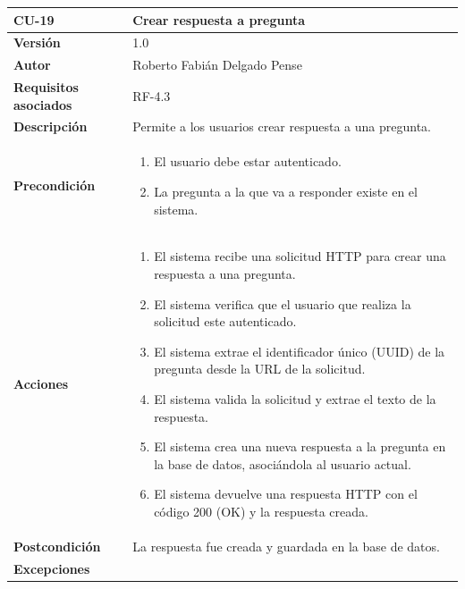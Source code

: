 \begin{table}[p]
	\centering
	\begin{tabularx}{\linewidth}{ p{} p{} }
		\toprule
		\textbf{CU-19}    & \textbf{Crear respuesta a pregunta}\\
		\toprule
		\textbf{Versión}              & 1.0    \\
		\textbf{Autor}                & Roberto Fabián Delgado Pense \\
		\textbf{Requisitos asociados} & RF-4.3 \\ 
		\textbf{Descripción}          & Permite a los usuarios crear respuesta a una pregunta.\\
		\textbf{Precondición}         & 
  		\begin{enumerate}
			\def\labelenumi{\arabic{enumi}.}
			\tightlist
                \item El usuario debe estar autenticado.
                \item La pregunta a la que va a responder existe en el sistema.
                \end{enumerate}\\
            \textbf{Acciones}             &
		\begin{enumerate}
			\def\labelenumi{\arabic{enumi}.}
			\tightlist
			\item El sistema recibe una solicitud HTTP para crear una respuesta a una pregunta.
                \item El sistema verifica que el usuario que realiza la solicitud este autenticado.
			\item El sistema extrae el identificador único (UUID) de la pregunta desde la URL de la solicitud.
			\item El sistema valida la solicitud y extrae el texto de la respuesta.
                \item El sistema crea una nueva respuesta a la pregunta en la base de datos, asociándola al usuario actual.
                \item El sistema devuelve una respuesta HTTP con el código 200 (OK) y la respuesta creada.            \end{enumerate}\\
		\textbf{Postcondición}        & La respuesta fue creada y guardada en la base de datos.\\
		\textbf{Excepciones}          & 
            \begin{enumerate}
			\def\labelenumi{\arabic{enumi}.}

\end{enumerate}
\end{tabularx}
\end{table}
